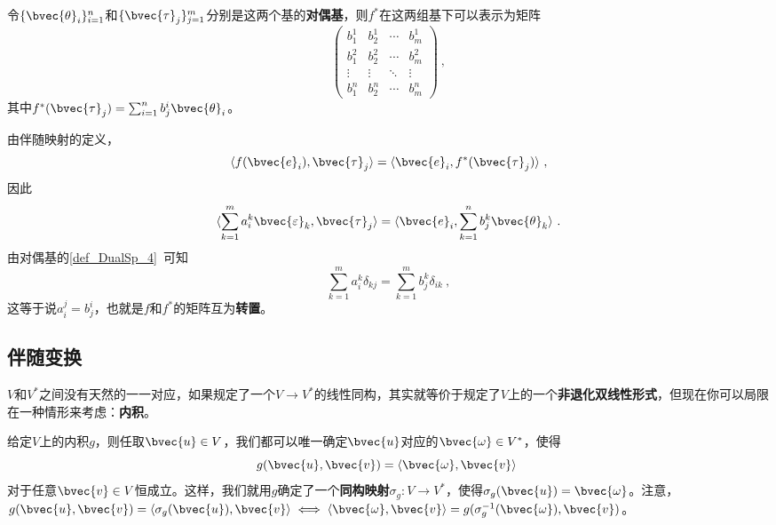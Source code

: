 令$\{\bvec{\theta}_i\}_{i=1}^n$和$\{\bvec{\tau}_j\}_{j=1}^m$分别是这两个基的\textbf{对偶基}，则$f^*$在这两组基下可以表示为矩阵
\begin{equation}
\begin{pmatrix}
b^1_1&b^1_2&\cdots&b^1_m\\
b^2_1&b^2_2&\cdots&b^2_m\\
\vdots&\vdots&\ddots&\vdots\\
b^n_1&b^n_2&\cdots&b^n_m
\end{pmatrix}~, 
\end{equation}
其中$f^*(\bvec{\tau}_j)=\sum_{i=1}^n b^i_j\bvec{\theta}_i$。

由伴随映射的定义，
\begin{equation}
\langle f(\bvec{e}_i), \bvec{\tau}_j \rangle =\langle \bvec{e}_i, f^*(\bvec{\tau}_j) \rangle ~, 
\end{equation}
因此
\begin{equation}
\langle \sum_{k=1}^m a^k_i\bvec{\varepsilon}_k, \bvec{\tau}_j \rangle =\langle \bvec{e}_i, \sum_{k=1}^n b^k_j\bvec{\theta}_k \rangle ~. 
\end{equation}
由对偶基的\autoref{def_DualSp_4}~可知
\begin{equation}
\sum_{k=1}^m a^k_i\delta_{kj} = \sum_{k=1}^m b^k_j\delta_{ik}~, 
\end{equation}
这等于说$a^j_i=b^i_j$，也就是$f$和$f^*$的矩阵互为\textbf{转置}。






\subsection{伴随变换}



$V$和$V^*$之间没有天然的一一对应，如果规定了一个$V\to V^*$的线性同构，其实就等价于规定了$V$上的一个\textbf{非退化双线性形式}，但现在你可以局限在一种情形来考虑：\textbf{内积}。

给定$V$上的内积$g$，则任取$\bvec{u}\in V$，我们都可以唯一确定$\bvec{u}$对应的$\bvec{\omega}\in V^*$，使得
\begin{equation}
g(\bvec{u}, \bvec{v}) = \langle \bvec{\omega}, \bvec{v} \rangle~
\end{equation}
对于任意$\bvec{v}\in V$恒成立。这样，我们就用$g$确定了一个\textbf{同构映射}$\sigma_g:V\to V^*$，使得$\sigma_g(\bvec{u})=\bvec{\omega}$。注意，$g(\bvec{u}, \bvec{v}) = \langle \sigma_g(\bvec{u}) , \bvec{v} \rangle \iff \langle \bvec{\omega}, \bvec{v} \rangle = g(\sigma_g^{-1}(\bvec{\omega}), \bvec{v})$。




